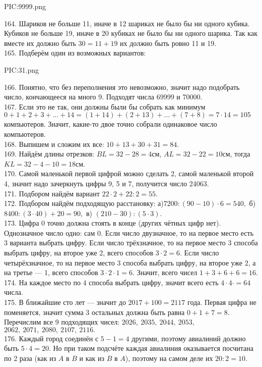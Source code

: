 \begin{center}
{{PIC:9999.png}}
\end{center}
164. Шариков не больше 11, иначе в 12 шариках не было бы ни одного кубика. Кубиков не больше 19, иначе в 20 кубиках не было бы ни одного шарика. Так как вместе их должно быть $30=11+19$ их должно быть ровно 11 и 19.\\
165. Подберём один из возможных вариантов:
\begin{center}
{{PIC:31.png}}
\end{center}
166. Понятно, что без переполнения это невозможно, значит надо подобрать число, кончающееся на много 9. Подходят числа 69999 и 70000.\\
167. Если это не так, они должны были бы собрать как минимум $0+1+2+3+\ldots+14=(1+14)+(2+13)+\ldots+(7+8)=7\cdot14=105$ компьютеров. Значит, какие-то двое точно собрали одинаковое число компьютеров.\\
168. Выпишем и сложим их все: $10+13+30+31=84.$\\
169. Найдём длины отрезков: $BL=32-28=4$см, $AL=32-22=10$см, тогда $KL=32-4-10=18$см.\\
170. Самой маленькой первой цифрой можно сделать 2, самой маленькой второй 4, значит надо зачеркнуть цифры 9, 5 и 7, получится число 24063.\\
171. Подбором найдём вариант $22\cdot2+22:2=55.$\\
172. Подбором найдём подходящую расстановку: а)$7200:(90-10)\cdot6=540,$ б) $8400:(3\cdot40)+20=90,$ в) $(210-30):(5\cdot3).$\\
173. Цифра 0 точно должна стоять в конце (других чётных цифр нет). Однозначное число одно: сам 0. Если число двузначное, то на первое место есть 3 варианта выбрать цифру. Если число трёхзначное, то на первое место 3 способа выбрать цифру, на второе уже 2, всего способов $3\cdot2=6.$ Если число четырёхзначное, то на первое место 3 способа выбрать цифру, на второе уже 2, а на третье --- 1, всего способов $3\cdot2\cdot1=6.$ Значит, всего чисел $1+3+6+6=16.$\\
174. На каждое место по 4 способа выбрать цифру, значит всего есть $4\cdot4\cdot=64$ числа.\\
175. В ближайшие сто лет --- значит до $2017+100=2117$ года. Первая цифра не поменяется, значит сумма 3 остальных должна быть равна $0+1+7=8.$ Перечислим все 9 подходящих чисел: $2026,\ 2035,\ 2044,\ 2053,$\\$2062,\ 2071,\ 2080,\ 2107,\ 2116.$\\
176. Каждый город соединён с $5-1=4$ другими, поэтому авиалиний должно быть $5\cdot4=20.$ Но при таком подсчёте каждая авиалиния оказывается посчитана по 2 раза (как из $A$ в $B$ и как из $B$ в $A$), поэтому на самом деле их $20:2=10.$\\
